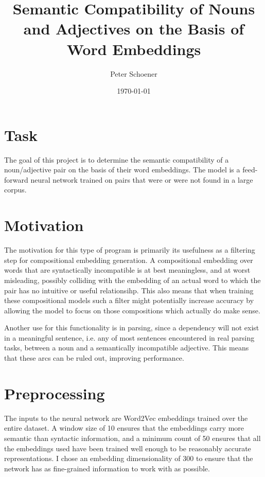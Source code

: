 \documentclass{article}
\begin{document}
\title{Semantic Compatibility of Nouns and Adjectives on the Basis of Word Embeddings}
\author{Peter Schoener}
\date{\today}
\maketitle

\section{Task}

The goal of this project is to determine the semantic compatibility of a noun/adjective pair on the basis of their word embeddings. The model is a feed-forward neural network trained on pairs that were or were not found in a large corpus.


\section{Motivation}

The motivation for this type of program is primarily its usefulness as a filtering step for compositional embedding generation. A compositional embedding over words that are syntactically incompatible is at best meaningless, and at worst misleading, possibly colliding with the embedding of an actual word to which the pair has no intuitive or useful relationsihp. This also means that when training these compositional models such a filter might potentially increase accuracy by allowing the model to focus on those compositions which actually do make sense.

Another use for this functionality is in parsing, since a dependency will not exist in a meaningful sentence, i.e. any of most sentences encountered in real parsing tasks, between a noun and a semantically incompatible adjective. This means that these arcs can be ruled out, improving performance.


\section{Preprocessing}

The inputs to the neural network are Word2Vec embeddings trained over the entire dataset. A window size of 10 ensures that the embeddings carry more semantic than syntactic information, and a minimum count of 50 ensures that all the embeddings used have been trained well enough to be reasonably accurate representations. I chose an embedding dimensionality of 300 to ensure that the network has as fine-grained information to work with as possible.
\end{document}

